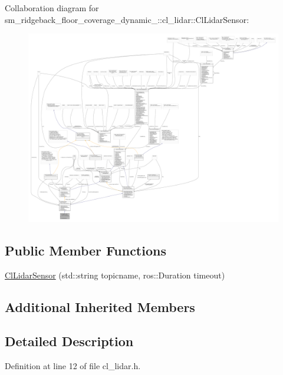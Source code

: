 Collaboration diagram for sm\+\_\+ridgeback\+\_\+floor\+\_\+coverage\+\_\+dynamic\+\_\+:\+:cl\+\_\+lidar\+:\+:Cl\+Lidar\+Sensor\+:
\nopagebreak
\begin{figure}[H]
\begin{center}
\leavevmode
\includegraphics[width=350pt]{classsm__ridgeback__floor__coverage__dynamic__1_1_1cl__lidar_1_1ClLidarSensor__coll__graph}
\end{center}
\end{figure}
\subsection*{Public Member Functions}
\begin{DoxyCompactItemize}
\item 
\hyperlink{classsm__ridgeback__floor__coverage__dynamic__1_1_1cl__lidar_1_1ClLidarSensor_adf266200f5a79795e1f0daf202bed47e}{Cl\+Lidar\+Sensor} (std\+::string topicname, ros\+::\+Duration timeout)
\end{DoxyCompactItemize}
\subsection*{Additional Inherited Members}


\subsection{Detailed Description}


Definition at line 12 of file cl\+\_\+lidar.\+h.



